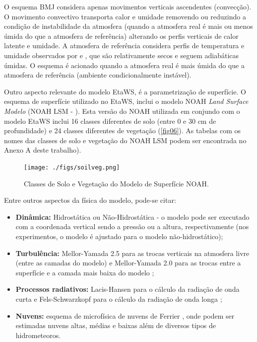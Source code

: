 O esquema BMJ considera apenas movimentos verticais ascendentes (convecção). O movimento convectivo transporta calor e umidade removendo ou reduzindo a condição de instabilidade da atmosfera (quando a atmosfera real é mais ou menos úmida do que a atmosfera de referência) alterando os perfis verticais de calor latente e umidade. A atmosfera de referência considera perfis de temperatura e umidade observados por  e , que são relativamente secos e seguem adiabáticas úmidas. O esquema é acionado quando a atmosfera real é mais úmida do que a atmosfera de referência (ambiente condicionalmente instável).

Outro aspecto relevante do modelo EtaWS, é a parametrização de superfície. O esquema de superfície utilizado no EtaWS, inclui o modelo NOAH \textit{Land Surface Modelo} (NOAH LSM - \cite{mitchell01}). Esta versão do NOAH utilizada em conjundo com o modelo EtaWS inclui 16 classes diferentes de solo (entre 0 e 30 cm de profundidade) e 24 classes diferentes de vegetação (\autoref{fig06}). As tabelas com os nomes das classes de solo e vegetação do NOAH LSM podem ser encontrada no Anexo A deste trabalho).

\begin{figure}[!hbp]
\centering
\texttt{[image: ./figs/soilveg.png]}
\caption{Classes de Solo e Vegetação do Modelo de Superfície NOAH.}
\label{fig08}
\end{figure}

Entre outros aspectos da física do modelo, pode-se citar:

\begin{itemize}
\item \textbf{Dinâmica:} Hidrostática ou Não-Hidrostática - o modelo pode ser executado com a coordenada vertical sendo a pressão ou a altura, respectivamente (nos experimentos, o modelo é ajustado para o modelo não-hidrostático);
\item \textbf{Turbulência:} Mellor-Yamada 2.5 para as trocas verticais na atmosfera livre (entre as camadas do modelo) e Mellor-Yamada 2.0 para as trocas entre a superfície e a camada mais baixa do modelo \cite{melloryamada74};
\item \textbf{Processos radiativos:} Lacis-Hansen para o cálculo da radiação de onda curta \cite{lacishansen74} e Fels-Schwarzkopf para o cálculo da radiação de onda longa \cite{felsschwarzkopf75};
\item \textbf{Nuvens:} esquema de microfísica de nuvens de Ferrier \cite{ferrieretal02}, onde podem ser estimadas nuvens altas, médias e baixas além de diversos tipos de hidrometeoros.
\end{itemize}

